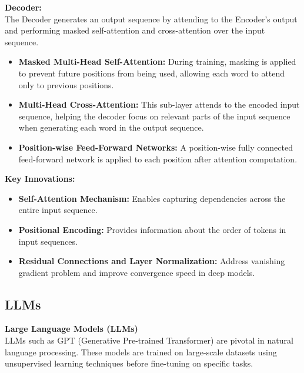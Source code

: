 \hfill \break
\textbf{Decoder:}  \\
The Decoder generates an output sequence by attending to the Encoder's output and performing masked self-attention and cross-attention over the input sequence.


\begin{itemize}
    \item \textbf{Masked Multi-Head Self-Attention:} During training, masking is applied to prevent future positions from being used, allowing each word to attend only to previous positions.
    
    \item \textbf{Multi-Head Cross-Attention:} This sub-layer attends to the encoded input sequence, helping the decoder focus on relevant parts of the input sequence when generating each word in the output sequence.
    
    \item \textbf{Position-wise Feed-Forward Networks:} A position-wise fully connected feed-forward network is applied to each position after attention computation.
\end{itemize}


\hfill \break
\textbf{Key Innovations:}

\begin{itemize}
    \item \textbf{Self-Attention Mechanism:} Enables capturing dependencies across the entire input sequence.
    
    \item \textbf{Positional Encoding:} Provides information about the order of tokens in input sequences.
    
    \item \textbf{Residual Connections and Layer Normalization:} Address vanishing gradient problem and improve convergence speed in deep models.
\end{itemize}

\newpage


\subsection{LLMs}

\hfill \break
\textbf{Large Language Models (LLMs)} \\

LLMs such as GPT (Generative Pre-trained Transformer) are pivotal in natural language processing. These models are trained on large-scale datasets using unsupervised learning techniques before fine-tuning on specific tasks.

